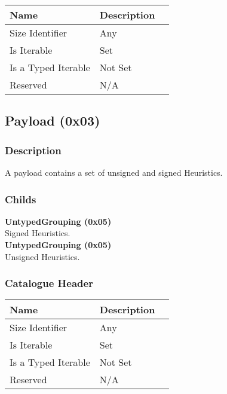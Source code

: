 \documentclass[11pt]{article}
\begin{document}
\begin{center}
\begin{tabular}{ |l|l|l| } 
\hline
\textbf{Name} & \textbf{Description}\\
\hline
Size Identifier & Any \\
Is Iterable & Set \\
Is a Typed Iterable & Not Set \\   
Reserved & N/A \\ 
\hline
\end{tabular}
\end{center}


\subsection{Payload (0x03)}
\subsubsection{Description}
A payload contains a set of unsigned and signed Heuristics.

\subsubsection{Childs}
\textbf{UntypedGrouping (0x05)} \\
Signed Heuristics. \\
\textbf{UntypedGrouping (0x05)} \\
Unsigned Heuristics. \\

\subsubsection{Catalogue Header}

\begin{center}
\begin{tabular}{ |l|l|l| } 
\hline
\textbf{Name} & \textbf{Description}\\
\hline
Size Identifier & Any \\
Is Iterable & Set \\
Is a Typed Iterable & Not Set \\   
Reserved & N/A \\ 
\hline
\end{tabular}
\end{center}

\end{document}
